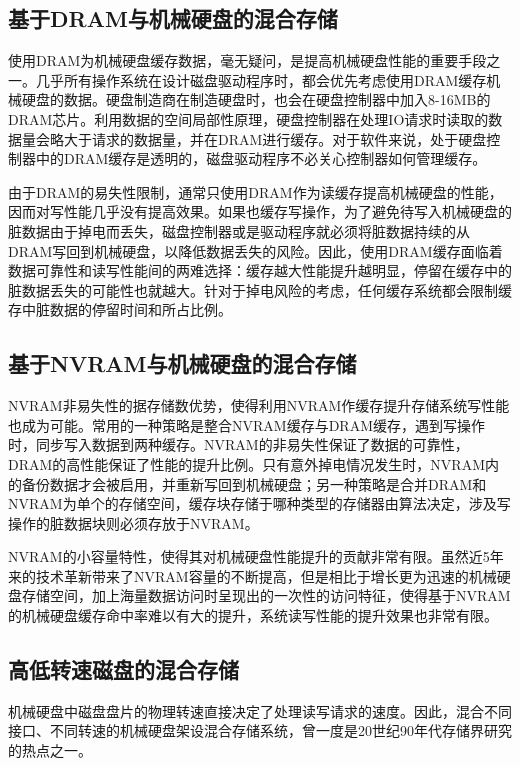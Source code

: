 \subsection{基于DRAM与机械硬盘的混合存储}

使用DRAM为机械硬盘缓存数据\cite{sdramcache2002}，毫无疑问，是提高机械硬盘性能的重要手段之一。几乎所有操作系统在设计磁盘驱动程序时，都会优先考虑使用DRAM缓存机械硬盘的数据。硬盘制造商在制造硬盘时，也会在硬盘控制器中加入8-16MB的DRAM芯片。利用数据的空间局部性原理，硬盘控制器在处理IO请求时读取的数据量会略大于请求的数据量，并在DRAM进行缓存。对于软件来说，处于硬盘控制器中的DRAM缓存是透明的，磁盘驱动程序不必关心控制器如何管理缓存。

由于DRAM的易失性限制，通常只使用DRAM作为读缓存提高机械硬盘的性能，因而对写性能几乎没有提高效果。如果也缓存写操作，为了避免待写入机械硬盘的脏数据由于掉电而丢失，磁盘控制器或是驱动程序就必须将脏数据持续的从DRAM写回到机械硬盘，以降低数据丢失的风险。因此，使用DRAM缓存面临着数据可靠性和读写性能间的两难选择：缓存越大性能提升越明显，停留在缓存中的脏数据丢失的可能性也就越大。针对于掉电风险的考虑，任何缓存系统都会限制缓存中脏数据的停留时间和所占比例。

\subsection{基于NVRAM与机械硬盘的混合存储}

NVRAM非易失性的据存储数优势，使得利用NVRAM作缓存提升存储系统写性能也成为可能。常用的一种策略是整合NVRAM缓存与DRAM缓存\cite{nvramcache2013}，遇到写操作时，同步写入数据到两种缓存。NVRAM的非易失性保证了数据的可靠性，DRAM的高性能保证了性能的提升比例。只有意外掉电情况发生时，NVRAM内的备份数据才会被启用，并重新写回到机械硬盘；另一种策略是合并DRAM和NVRAM为单个的存储空间，缓存块存储于哪种类型的存储器由算法决定，涉及写操作的脏数据块则必须存放于NVRAM。

NVRAM的小容量特性，使得其对机械硬盘性能提升的贡献非常有限。虽然近5年来的技术革新带来了NVRAM容量的不断提高，但是相比于增长更为迅速的机械硬盘存储空间，加上海量数据访问时呈现出的一次性的访问特征，使得基于NVRAM的机械硬盘缓存命中率难以有大的提升，系统读写性能的提升效果也非常有限。

\subsection{高低转速磁盘的混合存储}

机械硬盘中磁盘盘片的物理转速直接决定了处理读写请求的速度。因此，混合不同接口、不同转速的机械硬盘架设混合存储系统，曾一度是20世纪90年代存储界研究的热点之一。

